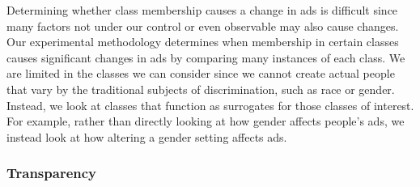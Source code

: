 \documentclass[10pt, onecolumn]{report}
\begin{document}
Determining whether class membership causes a change 
in ads is difficult since many factors not under our
control or even observable may also cause changes.  
Our experimental methodology determines when membership 
in certain classes causes significant changes in ads by comparing 
many instances of each class. 
We are limited in the classes we can consider since we cannot create 
actual people that vary by the traditional subjects of discrimination, 
such as race or gender. 
Instead, we look at classes that function as surrogates for those classes of interest.  
For example, rather than directly looking at how gender affects 
people's ads, we instead look at how altering a gender setting 
affects ads. %



\subsubsection{Transparency}
\end{document}
